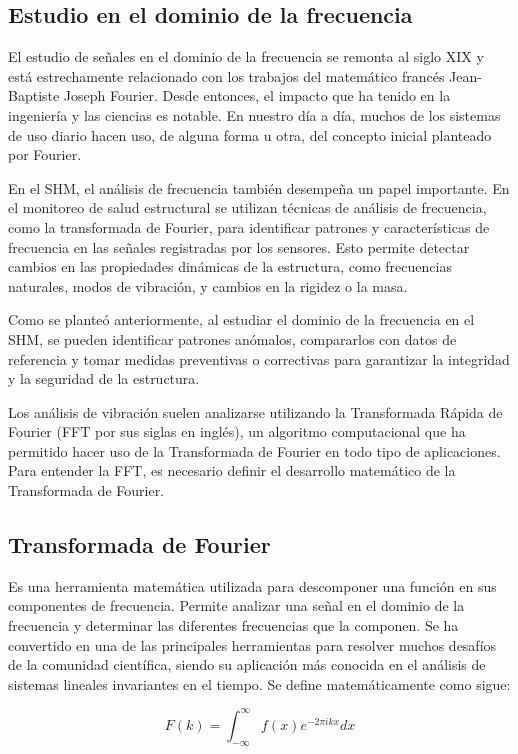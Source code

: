 \subsection{Estudio en el dominio de la frecuencia} El estudio de señales en el dominio de la frecuencia se remonta al siglo XIX y está estrechamente relacionado con los trabajos del matemático francés Jean-Baptiste Joseph Fourier. Desde entonces, el impacto que ha tenido en la ingeniería y las ciencias es notable. En nuestro día a día, muchos de los sistemas de uso diario hacen uso, de alguna forma u otra, del concepto inicial planteado por Fourier. 

En el SHM, el análisis de frecuencia también desempeña un papel importante. En el monitoreo de salud estructural se utilizan técnicas de análisis de frecuencia, como la transformada de Fourier, para identificar patrones y características de frecuencia en las señales registradas por los sensores. Esto permite detectar cambios en las propiedades dinámicas de la estructura, como frecuencias naturales, modos de vibración, y cambios en la rigidez o la masa.

Como se planteó anteriormente, al estudiar el dominio de la frecuencia en el SHM, se pueden identificar patrones anómalos, compararlos con datos de referencia y tomar medidas preventivas o correctivas para garantizar la integridad y la seguridad de la estructura.

Los análisis de vibración suelen analizarse utilizando la Transformada Rápida de Fourier (FFT por sus siglas en inglés), un algoritmo computacional que ha permitido hacer uso de la Transformada de Fourier en todo tipo de aplicaciones. Para entender la FFT, es necesario definir el desarrollo matemático de la Transformada de Fourier.

\subsection{Transformada de Fourier}
Es una herramienta matemática utilizada para descomponer una función en sus componentes de frecuencia. Permite analizar una señal en el dominio de la frecuencia y determinar las diferentes frecuencias que la componen. Se ha convertido en una de las principales herramientas para resolver muchos desafíos de la comunidad científica, siendo su aplicación más conocida en el análisis de sistemas lineales invariantes en el tiempo. Se define matemáticamente como sigue:

\begin{equation}
    F(k) = \int_{-\infty}^{\infty} f(x) e^{-2\pi i k x} dx
\end{equation}


